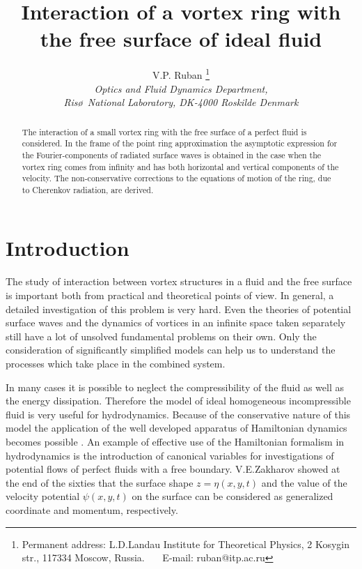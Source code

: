 \oddsidemargin  25pt
\evensidemargin 25pt
\topmargin -25pt
\textwidth 430pt
\textheight 670pt


\title{Interaction of a vortex ring with the free surface of ideal fluid}
\author{V.P. Ruban 
\footnote{Permanent address: L.D.Landau Institute for Theoretical Physics,
 2 Kosygin str., 117334 Moscow, Russia. ~~~E-mail: ruban@itp.ac.ru}\\
 {\it Optics and Fluid Dynamics Department,}\\
 {\it Ris\o ~National Laboratory, DK-4000 Roskilde Denmark}}

\maketitle
\begin{abstract}
The interaction of a small vortex ring with the free surface of a perfect fluid 
is considered. In the frame of the point ring approximation the asymptotic
expression for the Fourier-components of radiated surface waves is obtained
in the case when the vortex ring comes from infinity and has both horizontal 
and vertical components of the velocity. The non-conservative corrections 
to the equations of motion of the ring, due to Cherenkov radiation, are derived.
\end{abstract}

\section{Introduction}
The study of interaction  between vortex structures in a fluid and 
the free surface is important both from practical and theoretical points of 
view. In general, a detailed investigation of this problem is very hard. 
Even the theories of potential surface waves 
and the dynamics of vortices in an infinite space taken 
separately still have a lot of unsolved fundamental problems on their own.
Only the consideration of significantly simplified models can help us 
to understand the processes which take place in the combined system.

In many cases it is possible to neglect the compressibility of the fluid 
as well as the energy dissipation.
Therefore the model of ideal homogeneous incompressible fluid is very
useful for hydrodynamics. Because of the conservative nature of this model 
the application of the well developed apparatus of Hamiltonian dynamics
becomes possible \cite{Arnold} \cite{ZK97}.  
An example of effective use of the Hamiltonian
formalism in hydrodynamics is the introduction of canonical
variables for investigations of potential flows of perfect fluids with a 
free boundary. V.E.Zakharov showed
at the end of the sixties \cite{Z68} that the surface shape $z=\eta(x,y,t)$
and the value of the velocity potential $\psi(x,y,t)$ on the surface can be
considered as generalized coordinate and momentum, respectively.

